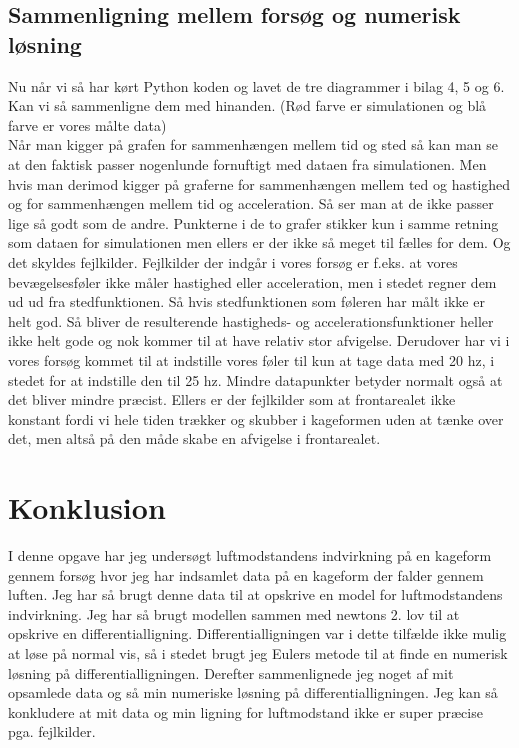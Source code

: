 \documentclass[12pt]{article}
\begin{document}
\subsection{Sammenligning mellem forsøg og numerisk løsning}
Nu når vi så har kørt Python koden og lavet de tre diagrammer i bilag 4, 5 og 6. Kan vi så sammenligne dem med hinanden.
(Rød farve er simulationen og blå farve er vores målte data)\\
Når man kigger på grafen for sammenhængen mellem tid og sted så kan man se at den faktisk passer nogenlunde fornuftigt med dataen fra simulationen.
Men hvis man derimod kigger på graferne for sammenhængen mellem ted og hastighed og for sammenhængen mellem tid og acceleration. Så ser man at de ikke
passer lige så godt som de andre. Punkterne i de to grafer stikker kun i samme retning som dataen for simulationen men ellers er der ikke så meget til fælles for dem.
Og det skyldes fejlkilder.
Fejlkilder der indgår i vores forsøg er f.eks. at vores bevægelsesføler ikke måler hastighed eller acceleration, men i stedet regner dem ud ud fra stedfunktionen.
Så hvis stedfunktionen som føleren har målt ikke er helt god. Så bliver de resulterende hastigheds- og accelerationsfunktioner heller ikke helt gode og nok kommer til
at have relativ stor afvigelse. Derudover har vi i vores forsøg kommet til at indstille vores føler til kun at tage data med 20 hz, i stedet for at indstille den til
25 hz. Mindre datapunkter betyder normalt også at det bliver mindre præcist. Ellers er der fejlkilder som at frontarealet ikke konstant fordi vi hele tiden trækker og
skubber i kageformen uden at tænke over det, men altså på den måde skabe en afvigelse i frontarealet.

\section{Konklusion}
I denne opgave har jeg undersøgt luftmodstandens indvirkning på en kageform gennem forsøg
hvor jeg har indsamlet data på en kageform der falder gennem luften. Jeg har så
brugt denne data til at opskrive en model for luftmodstandens indvirkning. Jeg har så
brugt modellen sammen med newtons 2. lov til at opskrive en differentialligning.
Differentialligningen var i dette tilfælde ikke mulig at løse på normal vis, så
i stedet brugt jeg Eulers metode til at finde en numerisk løsning på
differentialligningen. Derefter sammenlignede jeg noget af mit opsamlede data
og så min numeriske løsning på differentialligningen. Jeg kan så konkludere at mit
data og min ligning for luftmodstand ikke er super præcise pga. fejlkilder.
\end{document}

